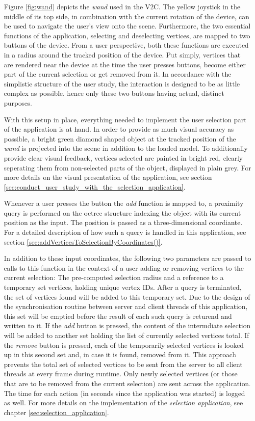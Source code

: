 Figure \ref{fig:wand} depicts the \textit{wand} used in the V2C. The yellow joystick in the middle of its top side, in combination with the current rotation of the device, can be used to navigate the user's view onto the scene. Furthermore, the two essential functions of the application, selecting and deselecting vertices, are mapped to two buttons of the device. From a user perspective, both these functions are executed in a radius around the tracked position of the device. Put simply, vertices that are rendered near the device at the time the user presses buttons, become either part of the current selection or get removed from it. In accordance with the simplistic structure of the user study, the interaction is designed to be as little complex as possible, hence only these two buttons having actual, distinct purposes. 

With this setup in place, everything needed to implement the user selection part of the application is at hand. In order to provide as much visual accuracy as possible, a bright green diamond shaped object at the tracked position of the \textit{wand} is projected into the scene in addition to the loaded model. To additionally provide clear visual feedback, vertices selected are painted in bright red, clearly seperating them from non-selected parts of the object, displayed in plain grey. For more details on the visual presentation of the application, see section \ref{sec:conduct_user_study_with_the_selection_application}.

Whenever a user presses the button the \textit{add} function is mapped to, a proximity query is performed on the octree structure indexing the object with its current position as the input. The position is passed as a three-dimensional coordiante. For a detailed description of how such a query is handled in this application, see section \ref{sec:addVerticesToSelectionByCoordinates()}.

In addition to these input coordinates, the following two parameters are passed to calls to this function in the context of a user adding or removing vertices to the current selection: The pre-computed selection radius and a reference to a temporary set vertices, holding unique vertex IDs. After a query is terminated, the set of vertices found will be added to this temporary set. Due to the design of the synchronisation routine between server and client threads of this application, this set will be emptied before the result of each such query is returend and written to it. If the \textit{add} button is pressed, the content of the intermdiate selection will be added to another set holding the list of currently selected vertices total. If the \textit{remove} button is pressed, each of the temporarily selected vertices is looked up in this second set and, in case it is found, removed from it. This approach prevents the total set of selected vertices to be sent from the server to all client threads at every frame during runtime. Only newly selected vertices (or those that are to be removed from the current selection) are sent across the application. The time for each action (in seconds since the application was started) is logged as well. For more details on the implementation of the \textit{selection application}, see chapter \ref{sec:selection_application}. 

